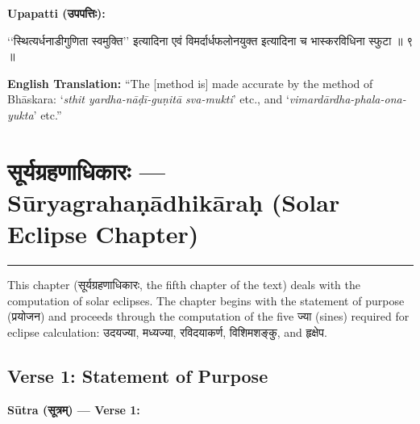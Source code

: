 \documentclass[11pt,a4paper]{article}
\newcommand{\dev}[1]{{\devanagarifont #1}}
\newenvironment{sanskritverse}{%
  \begin{center}\begin{minipage}{0.95\textwidth}
  \setlength{\leftskip}{1em}
  \setlength{\rightskip}{1em}
  \dev
}{\end{minipage}\end{center}}
\newenvironment{paracol}[1]{\begingroup}{\endgroup}
\newcommand{\switchcolumn}[1][]{%
  \ifnum#1=0\relax\else\par\nobreak\vspace{0.5em}\par\nobreak\fi%
}
\begin{document}
\vspace{0.5em}

\begin{paracol}{2}

\noindent\textbf{Upapatti (\dev{उपपत्तिः}):}
\begin{sanskritverse}
``स्थित्यर्धनाडीगुणिता स्वमुक्ति'' इत्यादिना एवं विमर्दार्धफलोनयुक्त इत्यादिना च
भास्करविधिना स्फुटा ॥ ९ ॥
\end{sanskritverse}

\switchcolumn

\textbf{English Translation:} ``The [method is] made accurate by the method of Bhāskara: `\textit{sthit yardha-nāḍī-guṇitā sva-mukti}' etc., and `\textit{vimardārdha-phala-ona-yukta}' etc.''

\end{paracol}

\newpage

\section{\texorpdfstring{{\devanagarifont सूर्यग्रहणाधिकारः} — Sūryagrahaṇādhikāraḥ (Solar Eclipse Chapter)}{Sūryagrahaṇādhikāraḥ (Solar Eclipse Chapter)}}
\label{sec:surya-grahana}

\begin{center}
\textcolor{rulecolor}{\rule{0.8\textwidth}{0.5pt}}
\end{center}

This chapter (\dev{सूर्यग्रहणाधिकारः}, the fifth chapter of the text) deals with the computation of solar eclipses. The chapter begins with the statement of purpose (\dev{प्रयोजन}) and proceeds through the computation of the five \dev{ज्या} (sines) required for eclipse calculation: \dev{उदयज्या}, \dev{मध्यज्या}, \dev{रविदयाकर्ण}, \dev{विशिमशङ्कु}, and \dev{हृक्षेप}.

\subsection{Verse 1: Statement of Purpose}

\vspace{0.5em}
\noindent\textbf{Sūtra (\dev{सूत्रम्}) — Verse 1:}
\end{document}
